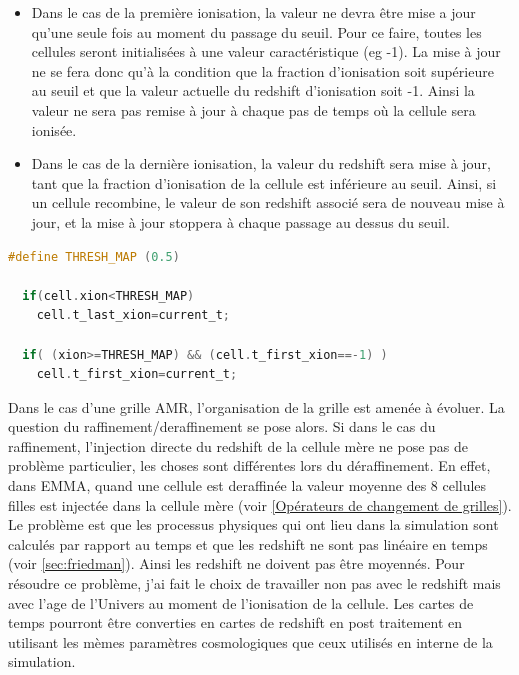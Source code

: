 \begin{itemize}
\item Dans le cas de la première ionisation, la valeur ne devra être mise a jour qu'une seule fois au moment du passage du seuil.
Pour ce faire, toutes les cellules seront initialisées à une valeur caractéristique (eg -1).
La mise à jour ne se fera donc qu'à la condition que la fraction d'ionisation soit supérieure au seuil et que la valeur actuelle du redshift d'ionisation soit -1.
Ainsi la valeur ne sera pas remise à jour à chaque pas de temps où la cellule sera ionisée. 

\item Dans le cas de la dernière ionisation, la valeur du redshift sera mise à jour, tant que la fraction d'ionisation de la cellule est inférieure au seuil.
Ainsi, si un cellule recombine, le valeur de son redshift associé sera de nouveau mise à jour, et la mise à jour stoppera à chaque passage au dessus du seuil.
\end{itemize}

\begin{lstlisting}[float=bth,language=c,frame=tb,caption={Mise a jour du redshift de reionisation},label=lst:majz]
  #define THRESH_MAP (0.5)

  if(cell.xion<THRESH_MAP)
    cell.t_last_xion=current_t;

  if( (xion>=THRESH_MAP) && (cell.t_first_xion==-1) )
    cell.t_first_xion=current_t;
\end{lstlisting}


Dans le cas d'une grille \ac{AMR}, l'organisation de la grille est amenée à évoluer.
La question du raffinement/deraffinement se pose alors.
Si dans le cas du raffinement, l'injection directe du redshift de la cellule mère ne pose pas de problème particulier, les choses sont différentes lors du déraffinement.
En effet, dans EMMA, quand une cellule est deraffinée la valeur moyenne des 8 cellules filles est injectée dans la cellule mère (voir \ref{Opérateurs de changement de grilles}).
Le problème est que les processus physiques qui ont lieu dans la simulation sont calculés par rapport au temps et que les redshift ne sont pas linéaire en temps (voir \ref{sec:friedman}).
Ainsi les redshift ne doivent pas être moyennés.
Pour résoudre ce problème, j'ai fait le choix de travailler non pas avec le redshift mais avec l'age de l'Univers au moment de l'ionisation de la cellule.
Les cartes de temps pourront être converties en cartes de redshift en post traitement en utilisant les mèmes paramètres cosmologiques que ceux utilisés en interne de la simulation.

